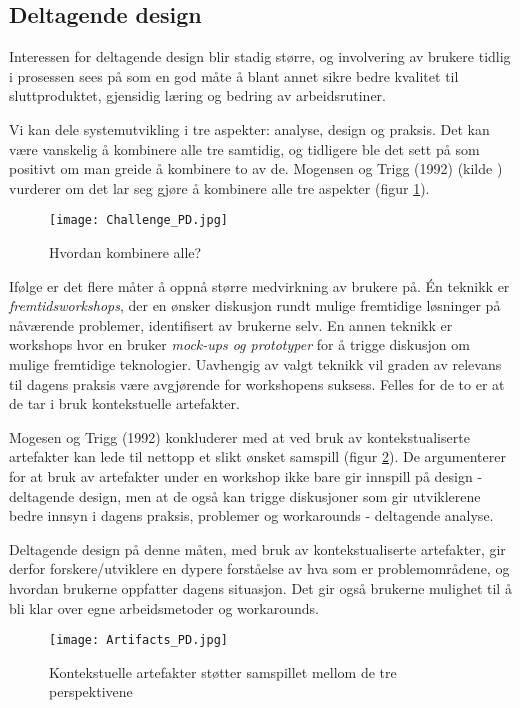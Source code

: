 \subsection{Deltagende design}
\label{chp: dd}

Interessen for deltagende design blir stadig større, og involvering av brukere tidlig i prosessen sees på som en god måte å blant annet sikre bedre kvalitet til sluttproduktet, gjensidig læring og bedring av arbeidsrutiner.

\noindent
Vi kan dele systemutvikling i tre aspekter: analyse, design og praksis. Det kan være vanskelig å kombinere alle tre samtidig, og tidligere ble det sett på som positivt om man greide å kombinere to av de. Mogensen og Trigg (1992) (kilde \cite{Mogensen92}) vurderer om det lar seg gjøre å kombinere alle tre aspekter (figur \ref{Challenge_PD}).

\begin{figure}[H]
\centering
\texttt{[image: Challenge\_PD.jpg]}
\caption{Hvordan kombinere alle?}
\label{Challenge_PD}
\end{figure}

\noindent
Ifølge \cite{Mogensen92} er det flere måter å oppnå større medvirkning av brukere på. Én teknikk er \emph{fremtidsworkshops}, der en ønsker diskusjon rundt mulige fremtidige løsninger på nåværende problemer, identifisert av brukerne selv. En annen teknikk er workshops hvor en bruker \emph{mock-ups og prototyper} for å trigge diskusjon om mulige fremtidige teknologier.  Uavhengig av valgt teknikk vil graden av relevans til dagens praksis være avgjørende for workshopens suksess. Felles for de to er at de tar i bruk kontekstuelle artefakter.

\noindent
Mogesen og Trigg (1992) konkluderer med at ved bruk av kontekstualiserte artefakter kan lede til nettopp et slikt ønsket samspill (figur \ref{Artifacts_PD}). De argumenterer for at bruk av artefakter under en workshop ikke bare gir innspill på design - deltagende design, men at de også kan trigge diskusjoner som gir utviklerene bedre innsyn i dagens praksis, problemer og workarounds - deltagende analyse. 

\noindent
Deltagende design på denne måten, med bruk av kontekstualiserte artefakter, gir derfor forskere/utviklere en dypere forståelse av hva som er problemområdene, og hvordan brukerne oppfatter dagens situasjon. Det gir også brukerne mulighet til å bli klar over egne arbeidsmetoder og workarounds.

\begin{figure}[H]
\centering
\texttt{[image: Artifacts\_PD.jpg]}
\caption{Kontekstuelle artefakter støtter samspillet mellom de tre perspektivene}
\label{Artifacts_PD}
\end{figure}